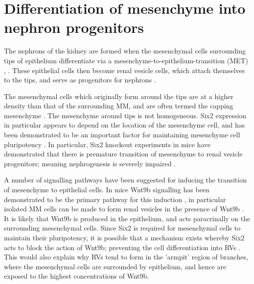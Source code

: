 \documentclass[pdftex,10pt,a4paper,twocolumn]{article}
\begin{document}
\section{Differentiation of mesenchyme into nephron progenitors}\label{sec:differentiation}
The nephrons of the kidney are formed when the mesenchymal cells surrounding tips of epithelium differentiate via a mesenchyme-to-epithelium-transition (MET) \cite{CostantiniFKopan2010}, \cite{LittleMMcMahon2012}. These epithelial cells then become renal vesicle cells, which attach themselves to the tips, and serve as progenitors for nephrons \cite{short2014global}. 

The mesenchymal cells which originally form around the tips are at a higher density than that of the surrounding MM, and are often termed the capping mesenchyme \cite{LittleMMcMahon2012}. The mesenchyme around tips is not homogeneous. Six2 expression in particular appears to depend on the location of the mesenchyme cell, and has been demonstrated to be an important factor for maintaining mesenchyme cell pluripotency \cite{LittleMMcMahon2012}. In particular, Six2 knockout experiments in mice have demonstrated that there is premature transition of mesenchyme to renal vesicle progenitors; meaning nephrogenesis is severely impaired \cite{self2006six2}.

A number of signalling pathways have been suggested for inducing the transition of mesenchyme to epithelial cells. In mice Wnt9b signalling has been demonstrated to be the primary pathway for this induction \cite{LittleMMcMahon2012}, in particular isolated MM cells can be made to form renal vesicles in the presence of Wnt9b \cite{carroll2005wnt9b}. It is likely that Wnt9b is produced in the epithelium, and acts paracrinally on the surrounding mesenchymal cells. Since Six2 is required for mesenchymal cells to maintain their pluripotency, it is possible that a mechanism exists whereby Six2 acts to block the action of Wnt9b; preventing the cell differentiation into RVs \cite{LittleMMcMahon2012}. This would also explain why RVs tend to form in the 'armpit' region of branches, where the mesenchymal cells are surrounded by epithelium, and hence are exposed to the highest concentrations of Wnt9b.
\end{document}
